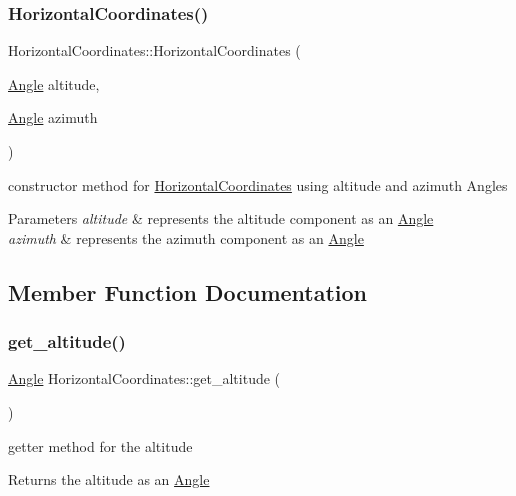 \subsubsection{\texorpdfstring{Horizontal\+Coordinates()}{HorizontalCoordinates()}}
{\footnotesize\ttfamily Horizontal\+Coordinates\+::\+Horizontal\+Coordinates (\begin{DoxyParamCaption}\item[{\mbox{\hyperlink{classAngle}{Angle}}}]{altitude,  }\item[{\mbox{\hyperlink{classAngle}{Angle}}}]{azimuth }\end{DoxyParamCaption})}



constructor method for \mbox{\hyperlink{classHorizontalCoordinates}{Horizontal\+Coordinates}} using altitude and azimuth Angles 


\begin{DoxyParams}{Parameters}
{\em altitude} & represents the altitude component as an \mbox{\hyperlink{classAngle}{Angle}} \\
\hline
{\em azimuth} & represents the azimuth component as an \mbox{\hyperlink{classAngle}{Angle}} \\
\hline
\end{DoxyParams}


\subsection{Member Function Documentation}
\mbox{\label{classHorizontalCoordinates_a9c28aef9ec9276dea5d58fe5d8c4bece}} 
\subsubsection{\texorpdfstring{get\+\_\+altitude()}{get\_altitude()}}
{\footnotesize\ttfamily \mbox{\hyperlink{classAngle}{Angle}} Horizontal\+Coordinates\+::get\+\_\+altitude (\begin{DoxyParamCaption}{ }\end{DoxyParamCaption})}



getter method for the altitude 

\begin{DoxyReturn}{Returns}
the altitude as an \mbox{\hyperlink{classAngle}{Angle}} 
\end{DoxyReturn}
\mbox{\label{classHorizontalCoordinates_afb4b783738b13dbfb23035946c8a210d}} 
